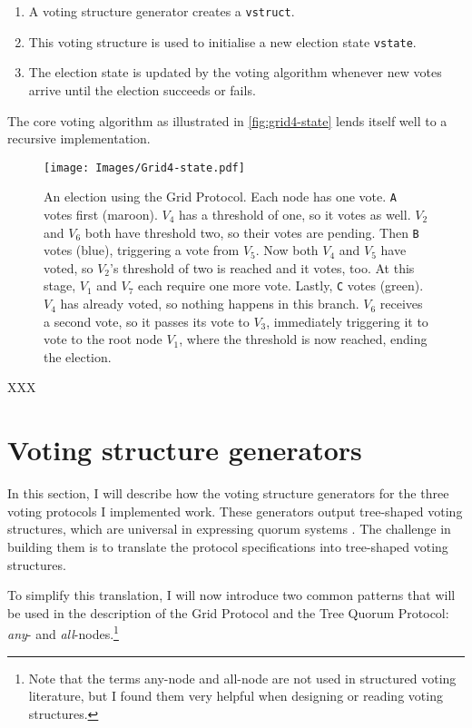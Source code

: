 \documentclass[11pt,chapterprefix=true,toc=bibliography,numbers=noendperiod,
               footnotes=multiple,twoside]{scrreprt}
\begin{document}
\begin{enumerate}
    \item A voting structure generator creates a \texttt{vstruct}.
    \item This voting structure is used to initialise a new election state \texttt{vstate}.
    \item The election state is updated by the voting algorithm whenever new votes arrive until the election succeeds or fails.
\end{enumerate}

The core voting algorithm as illustrated in \autoref{fig:grid4-state} lends itself well to a recursive implementation.

\begin{figure}[p]
    \centering
    \texttt{[image: Images/Grid4-state.pdf]}
    \caption[An election using the Grid Protocol]{An election using the Grid Protocol. Each node has one vote. \texttt{A} votes first (maroon). \(V_4\) has a threshold of one, so it votes as well. \(V_2\) and \(V_6\) both have threshold two, so their votes are pending. Then \texttt{B} votes (blue), triggering a vote from \(V_5\). Now both \(V_4\) and \(V_5\) have voted, so \(V_2\)'s threshold of two is reached and it votes, too. At this stage, \(V_1\) and \(V_7\) each require one more vote. Lastly, \texttt{C} votes (green). \(V_4\) has already voted, so nothing happens in this branch. \(V_6\) receives a second vote, so it passes its vote to \(V_3\), immediately triggering it to vote to the root node \(V_1\), where the threshold is now reached, ending the election.}
    \label{fig:grid4-state}
\end{figure}

XXX

\section{Voting structure generators}

In this section, I will describe how the voting structure generators for the three voting protocols I implemented work. These generators output tree-shaped voting structures, which are universal in expressing quorum systems \autocite{structures}. The challenge in building them is to translate the protocol specifications into tree-shaped voting structures.

To simplify this translation, I will now introduce two common patterns that will be used in the description of the Grid Protocol and the Tree Quorum Protocol: \emph{any}- and \emph{all}-nodes.\footnote{Note that the terms any-node and all-node are not used in structured voting literature, but I found them very helpful when designing or reading voting structures.}
\end{document}

